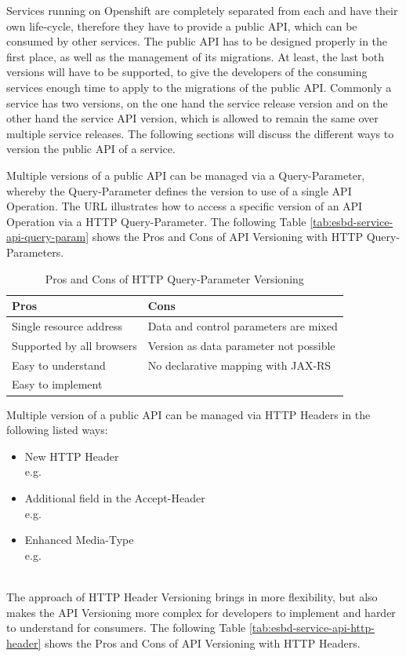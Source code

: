 Services running on Openshift are completely separated from each and have their own life-cycle, therefore they have to provide a public API, which can be consumed by other services. The public API has to be designed properly in the first place, as well as the management of its migrations. At least, the last both versions will have to be supported, to give the developers of the consuming services enough time to apply to the migrations of the public API. Commonly a service has two versions, on the one hand the service release version and on the other hand the service API version, which is allowed to remain the same over multiple service releases. The following sections will discuss the different ways to version the public API of a service.

Multiple versions of a public API can be managed via a Query-Parameter, whereby the Query-Parameter defines the version to use of a single API Operation. The URL  illustrates how to access a specific version of an API Operation via a HTTP Query-Parameter. The following Table \vref{tab:esbd-service-api-query-param} shows the Pros and Cons of API Versioning with HTTP Query-Parameters.

{\renewcommand{\arraystretch}{1.2}%
	\begin{table}[h]
		\begin{tabularx}{\textwidth}{ X|X }	
			\textbf{Pros}                 & \textbf{Cons}    \\  \hline
			Single resource address       & Data and control parameters are mixed     \\  
			Supported by all browsers     & Version as data parameter not possible     \\
			Easy to understand            & No declarative mapping with JAX-RS     \\
			Easy to implement             & \\ \hline
		\end{tabularx}
		\caption{Pros and Cons of HTTP Query-Parameter Versioning}
		\label{tab:esbd-service-api-query-param}
\end{table}}
Multiple version of a public API can be managed via HTTP Headers in the following listed ways:
\begin{itemize}
	\item New HTTP Header \\
	e.g. 
	\item Additional field in the Accept-Header \\
	e.g. 
	\item Enhanced Media-Type \\
	e.g. 
\end{itemize}
\ \\
The approach of HTTP Header Versioning brings in more flexibility, but also makes the API Versioning more complex for developers to implement and harder to understand for consumers. The following Table \vref{tab:esbd-service-api-http-header} shows the Pros and Cons of API Versioning with HTTP Headers.

